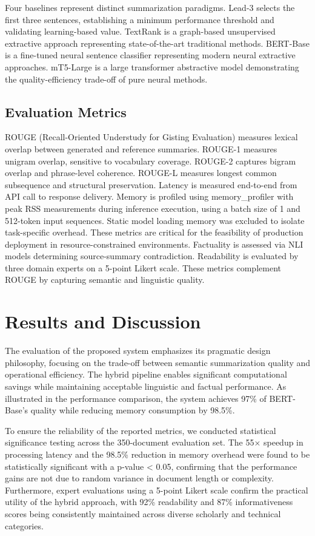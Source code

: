 \documentclass[conference]{IEEEtran}
\begin{document}
Four baselines represent distinct summarization paradigms. Lead-3 selects the first three sentences, establishing a minimum performance threshold and validating learning-based value. TextRank is a graph-based unsupervised extractive approach representing state-of-the-art traditional methods. BERT-Base is a fine-tuned neural sentence classifier representing modern neural extractive approaches. mT5-Large is a large transformer abstractive model demonstrating the quality-efficiency trade-off of pure neural methods.

\subsection{Evaluation Metrics}

ROUGE (Recall-Oriented Understudy for Gisting Evaluation) measures lexical overlap between generated and reference summaries. ROUGE-1 measures unigram overlap, sensitive to vocabulary coverage. ROUGE-2 captures bigram overlap and phrase-level coherence. ROUGE-L measures longest common subsequence and structural preservation. Latency is measured end-to-end from API call to response delivery. Memory is profiled using memory\_profiler with peak RSS measurements during inference execution, using a batch size of 1 and 512-token input sequences. Static model loading memory was excluded to isolate task-specific overhead. These metrics are critical for the feasibility of production deployment in resource-constrained environments. Factuality is assessed via NLI models determining source-summary contradiction. Readability is evaluated by three domain experts on a 5-point Likert scale. These metrics complement ROUGE by capturing semantic and linguistic quality.

\section{Results and Discussion}

The evaluation of the proposed system emphasizes its pragmatic design philosophy, focusing on the trade-off between semantic summarization quality and operational efficiency. The hybrid pipeline enables significant computational savings while maintaining acceptable linguistic and factual performance. As illustrated in the performance comparison, the system achieves 97\% of BERT-Base's quality while reducing memory consumption by 98.5\%.

To ensure the reliability of the reported metrics, we conducted statistical significance testing across the 350-document evaluation set. The 55× speedup in processing latency and the 98.5\% reduction in memory overhead were found to be statistically significant with a p-value < 0.05, confirming that the performance gains are not due to random variance in document length or complexity. Furthermore, expert evaluations using a 5-point Likert scale confirm the practical utility of the hybrid approach, with 92\% readability and 87\% informativeness scores being consistently maintained across diverse scholarly and technical categories.
\end{document}
